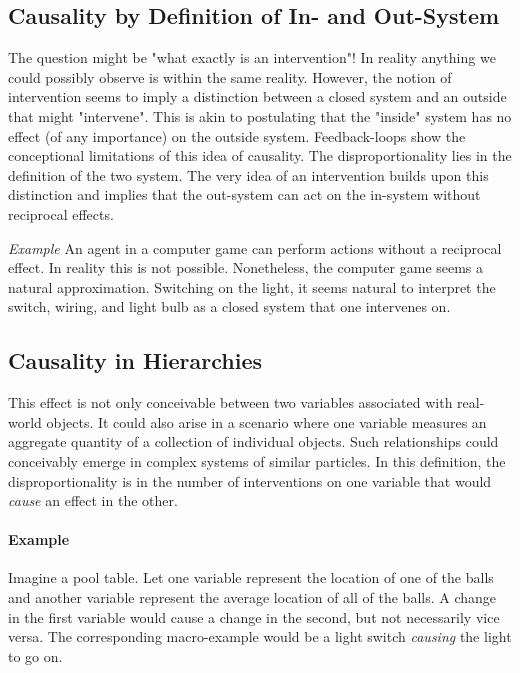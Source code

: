 \documentclass{article}
\begin{document}
\subsection{Causality by Definition of In- and Out-System}

The question might be "what exactly is an intervention"!
In reality anything we could possibly observe is within the same reality. However, the notion of intervention seems to imply a distinction between a closed system and an outside that might "intervene". This is akin to postulating that the "inside" system has no effect (of any importance) on the outside system. Feedback-loops show the conceptional limitations of this idea of causality.
The disproportionality lies in the definition of the two system. The very idea of an intervention builds upon this distinction and implies that the out-system can act on the in-system without reciprocal effects. 

\emph{Example} An agent in a computer game can perform actions without a reciprocal effect. In reality this is not possible. Nonetheless, the computer game seems a natural approximation. Switching on the light, it seems natural to interpret the switch, wiring, and light bulb as a closed system that one intervenes on.

\subsection{Causality in Hierarchies}
This effect is not only conceivable between two variables associated with real-world objects. It could also arise in a scenario where one variable measures an aggregate quantity of a collection of individual objects. Such relationships could conceivably emerge in complex systems of similar particles. In this definition, the disproportionality is in the number of interventions on one variable that would \emph{cause} an effect in the other.

\paragraph{Example} Imagine a pool table. Let one variable represent the location of one of the balls and another variable represent the average location of all of the balls. A change in the first variable would cause a change in the second, but not necessarily vice versa. The corresponding macro-example would be a light switch \emph{causing} the light to go on.


\clearpage

\end{document}
